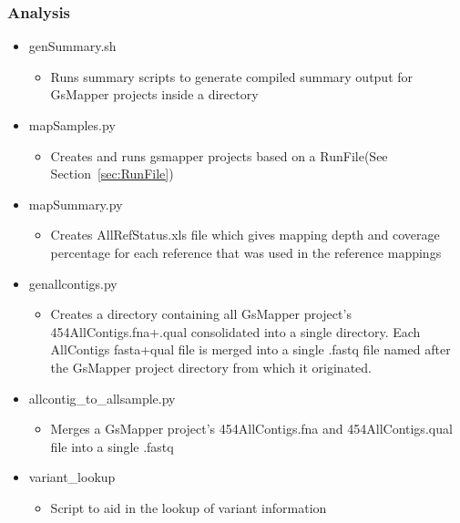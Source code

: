 \documentclass{article}
\begin{document}
\subsubsection{Analysis}
 \begin{itemize}
 \item genSummary.sh
  \begin{itemize}
   \item Runs summary scripts to generate compiled summary output for GsMapper projects inside a directory
  \end{itemize}
 \item mapSamples.py
  \begin{itemize}
   \item Creates and runs gsmapper projects based on a RunFile(See Section~\ref{sec:RunFile})
  \end{itemize}
 \item mapSummary.py
  \begin{itemize}
   \item Creates AllRefStatus.xls file which gives mapping depth and coverage percentage for each reference that was used in the reference mappings
  \end{itemize}
 \item genallcontigs.py
  \begin{itemize}
   \item Creates a directory containing all GsMapper project's 454AllContigs.fna+.qual consolidated into a single directory. Each AllContigs fasta+qual file is merged into a single .fastq file named after the GsMapper project directory from which it originated.
   \end{itemize}
 \item allcontig\_to\_allsample.py
  \begin{itemize}
   \item Merges a GsMapper project's 454AllContigs.fna and 454AllContigs.qual file into a single .fastq
  \end{itemize}
 \item variant\_lookup
  \begin{itemize}
   \item Script to aid in the lookup of variant information
  \end{itemize}
 \end{itemize}
\end{document}
